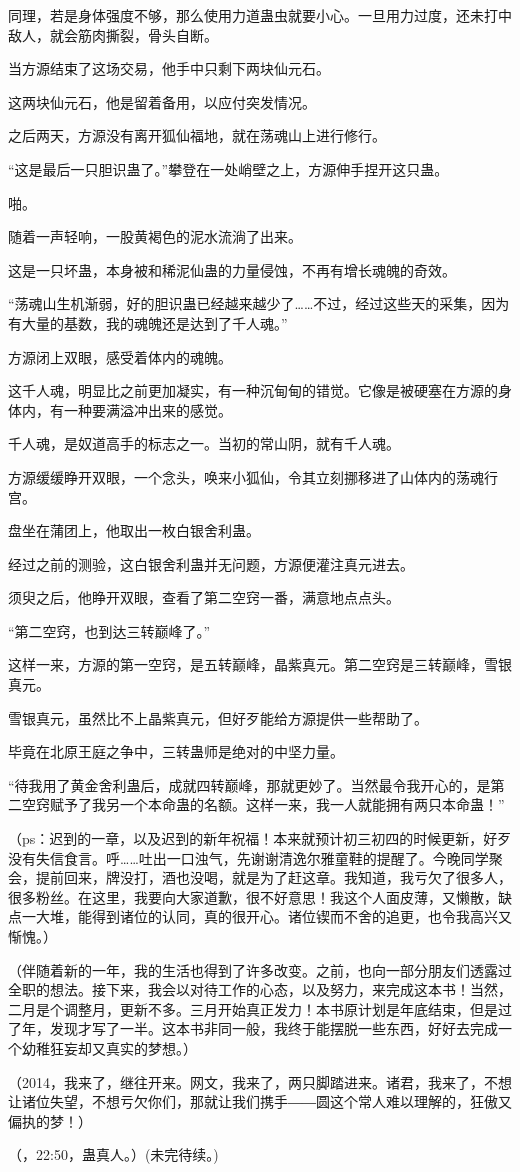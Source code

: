 \begin{this_body}
同理，若是身体强度不够，那么使用力道蛊虫就要小心。一旦用力过度，还未打中敌人，就会筋肉撕裂，骨头自断。

当方源结束了这场交易，他手中只剩下两块仙元石。

这两块仙元石，他是留着备用，以应付突发情况。

之后两天，方源没有离开狐仙福地，就在荡魂山上进行修行。

“这是最后一只胆识蛊了。”攀登在一处峭壁之上，方源伸手捏开这只蛊。

啪。

随着一声轻响，一股黄褐色的泥水流淌了出来。

这是一只坏蛊，本身被和稀泥仙蛊的力量侵蚀，不再有增长魂魄的奇效。

“荡魂山生机渐弱，好的胆识蛊已经越来越少了……不过，经过这些天的采集，因为有大量的基数，我的魂魄还是达到了千人魂。”

方源闭上双眼，感受着体内的魂魄。

这千人魂，明显比之前更加凝实，有一种沉甸甸的错觉。它像是被硬塞在方源的身体内，有一种要满溢冲出来的感觉。

千人魂，是奴道高手的标志之一。当初的常山阴，就有千人魂。

方源缓缓睁开双眼，一个念头，唤来小狐仙，令其立刻挪移进了山体内的荡魂行宫。

盘坐在蒲团上，他取出一枚白银舍利蛊。

经过之前的测验，这白银舍利蛊并无问题，方源便灌注真元进去。

须臾之后，他睁开双眼，查看了第二空窍一番，满意地点点头。

“第二空窍，也到达三转巅峰了。”

这样一来，方源的第一空窍，是五转巅峰，晶紫真元。第二空窍是三转巅峰，雪银真元。

雪银真元，虽然比不上晶紫真元，但好歹能给方源提供一些帮助了。

毕竟在北原王庭之争中，三转蛊师是绝对的中坚力量。

“待我用了黄金舍利蛊后，成就四转巅峰，那就更妙了。当然最令我开心的，是第二空窍赋予了我另一个本命蛊的名额。这样一来，我一人就能拥有两只本命蛊！”

（ps：迟到的一章，以及迟到的新年祝福！本来就预计初三初四的时候更新，好歹没有失信食言。呼……吐出一口浊气，先谢谢清逸尔雅童鞋的提醒了。今晚同学聚会，提前回来，牌没打，酒也没喝，就是为了赶这章。我知道，我亏欠了很多人，很多粉丝。在这里，我要向大家道歉，很不好意思！我这个人面皮薄，又懒散，缺点一大堆，能得到诸位的认同，真的很开心。诸位锲而不舍的追更，也令我高兴又惭愧。）

（伴随着新的一年，我的生活也得到了许多改变。之前，也向一部分朋友们透露过全职的想法。接下来，我会以对待工作的心态，以及努力，来完成这本书！当然，二月是个调整月，更新不多。三月开始真正发力！本书原计划是年底结束，但是过了年，发现才写了一半。这本书非同一般，我终于能摆脱一些东西，好好去完成一个幼稚狂妄却又真实的梦想。）

（2014，我来了，继往开来。网文，我来了，两只脚踏进来。诸君，我来了，不想让诸位失望，不想亏欠你们，那就让我们携手――圆这个常人难以理解的，狂傲又偏执的梦！）

（，22:50，蛊真人。）(未完待续。)

\end{this_body}

